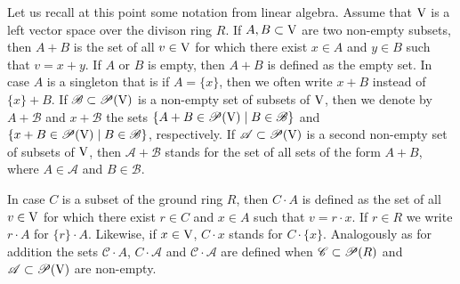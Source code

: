 \begin{remark}
  Let us recall at this point some notation from linear algebra. Assume that $\mathrm{V}$ is
  a left vector space over the divison ring $R$.
  If $A,B\subset \mathrm{V}$ are two non-empty subsets, then $A+B$ is
  the set of all $v\in \mathrm{V}$ for which there exist $x\in A$ and $y\in B$ such that
  $v = x+y$. If $A$ or $B$ is empty, then $A+B$ is defined as the empty set.
  In case $A$ is a singleton that is if $A =\{x\}$, then we often write $x + B$ instead of
  $\{x\} +B$. If $\mathscr{B} \subset \mathscr{P}(\mathrm{V})$ is a non-empty set of subsets of $\mathrm{V}$,
  then we denote by $A + \mathscr{B}$ and $x + \mathscr{B}$ the sets
  $\{ A + B \in \mathscr{P}(\mathrm{V}) \mid  B \in  \mathscr{B}\} $ and
  $\{ x + B \in \mathscr{P}(\mathrm{V}) \mid  B \in  \mathscr{B}\} $, respectively.
  If $\mathscr{A} \subset \mathscr{P}(\mathrm{V})$  is a  second non-empty set of subsets of $\mathrm{V}$,
  then $\mathscr{A} + \mathscr{B}$ stands for the set of all sets of the form $A+B$, where
  $A\in \mathscr{A}$ and $B\in \mathscr{B}$. 
  
  In case $C$ is a subset of the ground ring $R$, then $C \cdot A$ is defined as the set of all
  $v\in \mathrm{V}$ for which there exist
  $r\in C$ and $x\in A$ such that $v =r \cdot x$. If $r\in R$ we write $r\cdot A$
  for $\{r\} \cdot A$. Likewise, if $x \in \mathrm{V}$, $C\cdot x$ stands for $C\cdot\{x\}$.
  Analogously as for addition the sets $\mathscr{C}\cdot A$, $C\cdot \mathscr{A}$
  and $\mathscr{C}\cdot \mathscr{A}$ are defined when  
  $\mathscr{C} \subset \mathscr{P}(R)$ and $\mathscr{A} \subset \mathscr{P}(\mathrm{V})$
  are non-empty. 
\end{remark}

